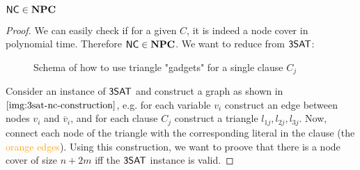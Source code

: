 \begin{theorem}
    $\mathsf{NC} \in \mathbf{NPC}$
\end{theorem}
\begin{proof}
    We can easily check if for a given $C$, it is indeed a node cover in polynomial time. Therefore $\mathsf{NC} \in \mathbf{NPC}$.
    We want to reduce from $\mathsf{3SAT}$:
    \begin{figure}[htbp]
        \centering
        \caption{Schema of how to use triangle "gadgets" for a single clause $C_j$}
        \label{img:3sat-nc-construction}
    \end{figure}

    Consider an instance of $\mathsf{3SAT}$ and construct a graph as shown in $\autoref{img:3sat-nc-construction}$, e.g.
    for each variable $v_i$ construct an edge between nodes $v_i$ and $\overline{v}_i$, and
    for each clause $C_j$ construct a triangle $l_{1j}, l_{2j}, l_{3j}$. Now, connect each node
    of the triangle with the corresponding literal in the clause (the \textcolor{orange}{orange edges}).
    Using this construction, we want to proove that there is a node cover of size $n+2m$ iff the $\mathsf{3SAT}$ instance is valid.


\end{proof}
